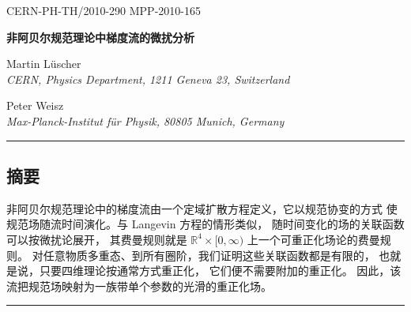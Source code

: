 \documentclass[11pt]{ctexart}
\numberwithin{equation}{section}
\newcommand{\rz}{\mathbb{R}}
\begin{document}
\begin{center}
{\small CERN-PH-TH/2010-290 \quad MPP-2010-165}

\vspace{1.0cm}
{\LARGE\bfseries 非阿贝尔规范理论中梯度流的微扰分析\par}

\vspace{0.9cm}
{\large Martin L\"uscher}\\[3pt]
{\itshape CERN, Physics Department, 1211 Geneva 23, Switzerland}

\vspace{0.45cm}
{\large Peter Weisz}\\[3pt]
{\itshape Max-Planck-Institut f\"ur Physik, 80805 Munich, Germany}
\end{center}

\vspace{0.4cm}

\vspace{0.35cm}
\noindent\rule{\textwidth}{0.4pt}
\vspace{-0.55cm}
\subsection*{摘要}
非阿贝尔规范理论中的梯度流由一个定域扩散方程定义，它以规范协变的方式
使规范场随流时间演化。与 Langevin 方程的情形类似，
随时间变化的场的关联函数可以按微扰论展开，
其费曼规则就是 $\rz^4\times[0,\infty)$ 上一个可重正化场论的费曼规则。
对任意物质多重态、到所有圈阶，我们证明这些关联函数都是有限的，
也就是说，只要四维理论按通常方式重正化，
它们便不需要附加的重正化。
因此，该流把规范场映射为一族带单个参数的光滑的重正化场。

\vspace{-0.25cm}
\noindent\rule{\textwidth}{0.4pt}











\end{document}
